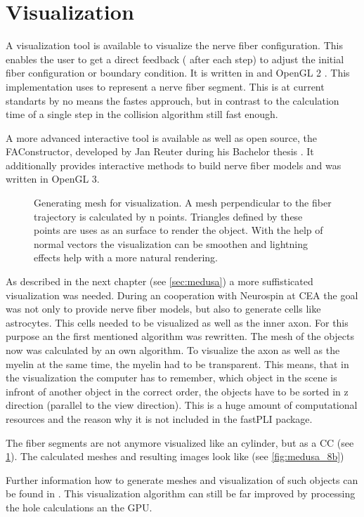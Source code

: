 \section{Visualization}\label{sec:visualization}
%
A visualization tool is available to visualize the nerve fiber configuration.
This enables the user to get a direct feedback (\eg{} after each step) to adjust the initial fiber configuration or boundary condition.
It is written in \cpp{} and \ac{OpenGL} 2 \cite{isocpp, khronos}.
This implementation uses  to represent a nerve fiber segment.
This is at current standarts by no means the fastes approuch, but in contrast to the calculation time of a single step in the collision algorithm still fast enough.
\par
% 
A more advanced interactive tool is available as well as open source, the FAConstructor, developed by Jan Reuter during his Bachelor thesis \cite{Reuter2019}.
It additionally provides interactive methods to build nerve fiber models and was written in \ac{OpenGL} 3.
\par
%
%
\begin{figure}[!t]
    \centering
    \setlength{\tikzwidth}{0.75\textwidth}
	\caption[Nerve fiber visualization example]{Generating mesh for visualization. A mesh perpendicular to the fiber trajectory is calculated by n points. Triangles defined by these points are uses as an surface to render the object. With the help of normal vectors the visualization can be smoothen and lightning effects help with a more natural rendering.}
	\label{fig:vis_mesh}
\end{figure}
%
As described in the next chapter (see \cref{sec:medusa}) a more suffisticated visualization was needed.
During an cooperation with Neurospin at \ac{CEA} the goal was not only to provide nerve fiber models, but also to generate cells like astrocytes.
This cells needed to be visualized as well as the inner axon.
For this purpose an the first mentioned algorithm was rewritten.
The mesh of the objects now was calculated by an own algorithm.
To visualize the axon as well as the myelin at the same time, the myelin had to be transparent.
This means, that in the visualization the computer has to remember, which object in the scene is infront of another object in the correct order, \ie{} the objects have to be sorted in z direction (parallel to the view direction).
This is a huge amount of computational resources and the reason why it is not included in the \ac{fastPLI} package.
\par
The fiber segments are not anymore visualized like an cylinder, but as a \ac{CC} (see \cref{fig:vis_mesh}).
The calculated meshes and resulting images look like (see \cref{fig:medusa_8b})
\par
Further information how to generate meshes and visualization of such objects can be found in \cite{9780134495491}.
This visualization algorithm can still be far improved by processing the hole calculations an the \ac{GPU}.
%
% 
% 
